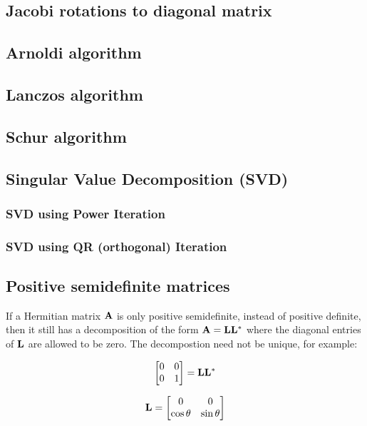 \subsection{Jacobi rotations to diagonal matrix}
\subsection{Arnoldi algorithm}
\subsection{Lanczos algorithm}
\subsection{Schur algorithm}

\subsection{Singular Value Decomposition (SVD)}
\subsubsection{SVD using Power Iteration}
\subsubsection{SVD using QR (orthogonal) Iteration}


\subsection{Positive semidefinite matrices}

If a Hermitian matrix $ \mathbf{A} $ is only positive semidefinite, instead of positive
definite, then it still has a decomposition of the form $ \mathbf{A} = \mathbf{L} \mathbf{L}^* $
where the diagonal entries of $ \mathbf{L} $ are allowed to be zero. The decompostion
need not be unique, for example:

\begin{equation}
    \begin{bmatrix}
        0 & 0 \\
        0 & 1\\
    \end{bmatrix}
    = \mathbf{L} \mathbf{L}^*
\end{equation}

\begin{equation}
    \mathbf{L} =
    \begin{bmatrix}
        0 & 0 \\
        \cos \theta & \sin \theta
    \end{bmatrix}
\end{equation}

